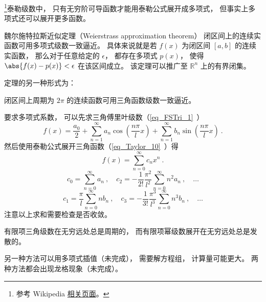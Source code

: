 \begin{issues}
\issueDraft
\end{issues}


\footnote{参考 Wikipedia \href{https://en.wikipedia.org/wiki/Stone–Weierstrass theorem}{相关页面}。}泰勒级数中， 只有无穷阶可导函数才能用泰勒公式展开成多项式， 但事实上多项式还可以展开更多函数。

\begin{theorem}{魏尔施特拉斯近似定理（Weierstrass approximation theorem）}
闭区间上的连续实函数可用多项式级数一致逼近。 具体来说就是若 $f(x)$ 为闭区间 $[a, b]$ 的连续实函数， 那么对于任意给定的 $\epsilon$， 都存在多项式 $p(x)$， 使得 $\abs{f(x) - p(x)} < \epsilon$ 在该区间成立。 该定理可以推广至 $\mathbb {R}^{n}$ 上的有界闭集。
\end{theorem}

定理的另一种形式为：
\begin{theorem}{}
闭区间上周期为 $2\pi$ 的连续函数可用三角函数级数一致逼近。
\end{theorem}

要求多项式系数， 可以先求三角傅里叶级数（\autoref{eq_FSTri_1}~）
\begin{equation}
f(x) = \frac{a_0}{2} + \sum_{n = 1}^\infty a_n \cos (\frac{n\pi}{l}x) + \sum_{n = 1}^\infty b_n \sin (\frac{n\pi}{l}x)~.
\end{equation}
然后使用泰勒公式展开三角函数（\autoref{eq_Taylor_10}~）得
\begin{equation}
f(x) = \sum_{n=0}^\infty c_n x^n~.
\end{equation}
\begin{equation}
c_0 = \sum_{n=0}^\infty a_n~,
\quad
c_2 = -\frac{1}{2!}\frac{\pi^2}{l^2} \sum_{n=0}^\infty n^2 a_n~, \quad \dots
\end{equation}
\begin{equation}
c_1 = \frac{\pi}{l} \sum_{n=0}^\infty n b_n~,
\quad
c_3 = -\frac{1}{3!}\frac{\pi^3}{l^3} \sum_{n=0}^\infty n^3 b_n~, \quad \dots
\end{equation}
注意以上求和需要检查是否收敛。

有限项三角级数在无穷远处总是周期的， 而有限项幂级数展开在无穷远处总是发散的。

另一种方法可以用多项式插值（未完成）， 需要解方程组， 计算量可能更大。 两种方法都会出现龙格现象（未完成）。
